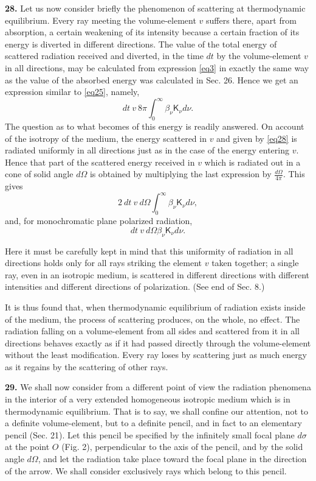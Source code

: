 \documentclass[12pt,oneside]{book}
\begin{document}
\textbf{28.} Let us now consider briefly the phenomenon of scattering at thermodynamic equilibrium. Every ray meeting the volume-element $v$ suffers there, apart from absorption, a certain weakening of its intensity because a certain fraction of its energy is diverted in different directions. The value of the total energy of scattered radiation received and diverted, in the time $dt$ by the volume-element $v$ in all directions, may be calculated from expression \eqref{eq3} in exactly the same way as the value of the absorbed energy was calculated in Sec. 26. Hence we get an expression similar to \eqref{eq25}, namely,
\begin{equation}
    dt\ v\ 8\pi\int_0^\infty\beta_\nu\mathsf{K}_\nu d\nu.
    \label{eq28}
\end{equation}
The question as to what becomes of this energy is readily answered. On account of the isotropy of the medium, the energy scattered in $v$ and given by \eqref{eq28} is radiated uniformly in all directions just as in the case of the energy entering $v$. Hence that part of the scattered energy received in $v$ which is radiated out in a cone of solid angle $d\Omega$ is obtained by multiplying the last expression by $\frac{d\Omega}{4\pi}$. This gives
$$2\ dt\ v\ d\Omega\int_0^\infty\beta_\nu\mathsf{K}_\nu d\nu,$$
and, for monochromatic plane polarized radiation,
\begin{equation}
    dt\ v\ d\Omega\beta_\nu\mathsf{K}_\nu d\nu.
    \label{eq29}
\end{equation} \par

Here it must be carefully kept in mind that this uniformity of radiation in all directions holds only for all rays striking the element $v$ taken together; a single ray, even in an isotropic medium, is scattered in different directions with different intensities and different directions of polarization. (See end of Sec. 8.) \par

It is thus found that, when thermodynamic equilibrium of radiation exists inside of the medium, the process of scattering produces, on the whole, no effect. The radiation falling on a volume-element from all sides and scattered from it in all directions behaves exactly as if it had passed directly through the volume-element without the least modification. Every ray loses by scattering just as much energy as it regains by the scattering of other rays. \par

\textbf{29.} We shall now consider from a different point of view the radiation phenomena in the interior of a very extended homogeneous isotropic medium which is in thermodynamic equilibrium. That is to say, we shall confine our attention, not to a definite volume-element, but to a definite pencil, and in fact to an elementary pencil (Sec. 21). Let this pencil be specified by the infinitely small focal plane $d\sigma$ at the point $O$ (Fig. 2), perpendicular to the axis of the pencil, and by the solid angle $d\Omega$, and let the radiation take place toward the focal plane in the direction of the arrow. We shall consider exclusively rays which belong to this pencil. \par
\end{document}
